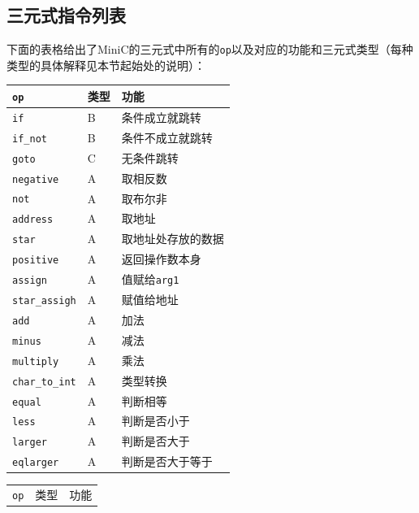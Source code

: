 \subsection{三元式指令列表}
\label{tripleinst}
下面的表格给出了MiniC的三元式中所有的\verb|op|以及对应的功能和三元式类型（每种类型的具体解释见本节起始处的说明）：
\begin{center}
\begin{minipage}{0.48\textwidth}
\begin{flushleft}
	\begin{tabular}{|l|l|l|}
	\hline
		\verb|op| & 类型 & 功能 \\
	\hline
		\verb|if| & B & 条件成立就跳转 \\
	\hline
		\verb|if_not| & B & 条件不成立就跳转 \\
	\hline
		\verb|goto| & C & 无条件跳转\\
	\hline 
		\verb|negative| & A & 取相反数\\
	\hline
		\verb|not| & A & 取布尔非\\
	\hline
		\verb|address| & A & 取地址\\
	\hline
		\verb|star| & A & 取地址处存放的数据\\
	\hline
		\verb|positive| & A & 返回操作数本身\\
	\hline
		\verb|assign| & A & 值赋给\verb|arg1|\\
	\hline
		\verb|star_assigh| & A & 赋值给地址\\
	\hline 
		\verb|add| & A & 加法\\
	\hline 
		\verb|minus| & A & 减法\\
	\hline
		\verb|multiply| & A & 乘法\\
	\hline 
		\verb|char_to_int| & A & 类型转换\\
	\hline
		\verb|equal| & A & 判断相等\\
	\hline
		\verb|less| & A & 判断是否小于\\
	\hline 
		\verb|larger| & A & 判断是否大于\\
	\hline
		\verb|eqlarger| & A & 判断是否大于等于\\
	\hline
	\end{tabular} 
\end{flushleft}
\end{minipage}
\begin{minipage}{0.48\textwidth}
\begin{flushright}
\begin{tabular}{|l|l|l|}
	\hline
		\verb|op| & 类型 & 功能 \\

\end{tabular}
\end{flushright}
\end{minipage}
\end{center}
